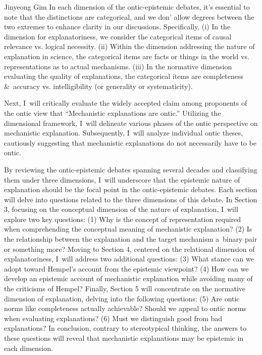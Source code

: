 \begin{artengenv}{Jinyeong Gim}
In each dimension of the ontic-epistemic debates, it's essential to note that the distinctions are categorical, and we don' allow degrees between the two extremes to enhance clarity in our discussions. Specifically, (i) In the dimension for explanatoriness, we consider the categorical items of causal relevance vs. logical necessity. (ii) Within the dimension addressing the nature of explanation in science, the categorical items are facts or things in the world vs. representations as to actual mechanisms. (iii) In the normative dimension evaluating the quality of explanations, the categorical items are completeness \&~accuracy vs. intelligibility (or generality or systematicity).

Next, I~will critically evaluate the widely accepted claim among proponents of the ontic view that ``Mechanistic explanations are ontic.'' Utilizing the dimensional framework, I~will delineate various phases of the ontic perspective on mechanistic explanation. Subsequently, I~will analyze individual ontic theses, cautiously suggesting that mechanistic explanations do not necessarily have to be ontic.

By reviewing the ontic-epistemic debates spanning several decades and classifying them under three dimensions, I~will underscore that the epistemic nature of explanation should be the focal point in the ontic-epistemic debates. Each section will delve into questions related to the three dimensions of this debate. In Section 3, focusing on the conceptual dimension of the nature of explanation, I~will explore two key questions: (1) Why is the concept of representation required when comprehending the conceptual meaning of mechanistic explanation? (2) Is the relationship between the explanation and the target mechanism a~binary pair or something more? Moving to Section 4, centered on the relational dimension of explanatoriness, I~will address two additional questions: (3) What stance can we adopt toward Hempel's account from the epistemic viewpoint? (4) How can we develop an epistemic account of mechanistic explanation while avoiding many of the criticisms of Hempel? Finally, Section 5 will concentrate on the normative dimension of explanation, delving into the following questions: (5) Are ontic norms like completeness actually achievable? Should we appeal to ontic norms when evaluating explanations? (6) Must we distinguish good from bad explanations? In conclusion, contrary to stereotypical thinking, the answers to these questions will reveal that mechanistic explanations may be epistemic in each dimension.


\end{artengenv}
